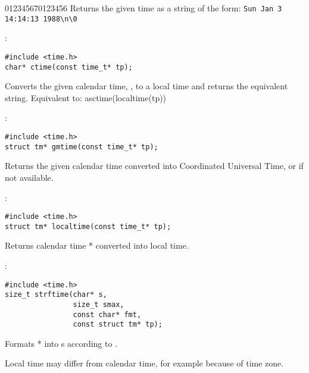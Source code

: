 \begin{Ventry2}{012345670123456}
     Returns the given time as a string of the form:
     \verb+Sun Jan 3 14:14:13 1988\n\0+
\item[ctime]
\label{item:ctime}
:
\begin{production}
\begin{verbatim}
#include <time.h>
char* ctime(const time_t* tp);
\end{verbatim}
\end{production}

     Converts the given calendar time, , to a local time and
     returns the equivalent string. Equivalent to:
     asctime(localtime(tp))

\item[gmtime]
\label{item:gmtime}
:
\begin{production}
\begin{verbatim}
#include <time.h>
struct tm* gmtime(const time_t* tp);
\end{verbatim}
\end{production}

     Returns the given calendar time converted into Coordinated Universal Time,
     or  if not available.

\item[localtime]
\label{item:localtime}
:
\begin{production}
\begin{verbatim}
#include <time.h>
struct tm* localtime(const time_t* tp);
\end{verbatim}
\end{production}

     Returns calendar time * converted into local time.

\item[strftime]
\label{item:strftime}
:
\begin{production}
\begin{verbatim}
#include <time.h>
size_t strftime(char* s, 
                size_t smax, 
                const char* fmt, 
                const struct tm* tp);
\end{verbatim}
\end{production}

     Formats * into s according to .

\item[Notes]

   Local time may differ from calendar time, for example because of time
     zone.

\end{Ventry2}

